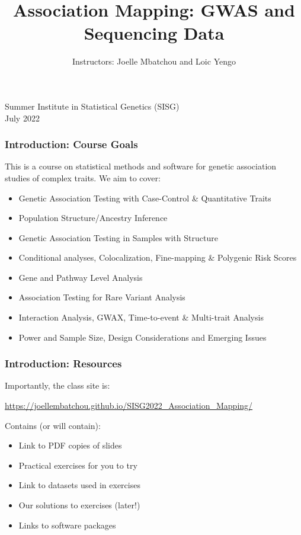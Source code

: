 \documentclass{beamer}
\title [Introduction to Association Mapping Module] {  \fontsize{12}{15}\selectfont Association Mapping: GWAS and Sequencing Data }
\author{Instructors: Joelle Mbatchou and Loic Yengo}
\date{}
\begin{document}
\begin{frame}
\titlepage
\vspace{-2cm}
\begin{center}
{ \large Summer Institute in Statistical Genetics (SISG) \\}
\vspace{.3cm}
 {\large July 2022 \\}
\vspace{.8cm}
\end{center}
\end{frame}



\begin{frame}
\frametitle{\bf Introduction: Course Goals}
This is a course on statistical methods and software for genetic association studies of complex traits. We aim to cover:
{\small
\begin{itemize}
\item Genetic Association Testing with Case-Control  \& Quantitative Traits
\item Population Structure/Ancestry Inference 
\item Genetic Association Testing in Samples with Structure
\item Conditional analyses, Colocalization, Fine-mapping \& Polygenic Risk Scores
\item Gene and Pathway Level Analysis 
\item Association Testing for Rare Variant Analysis
\item Interaction Analysis, GWAX, Time-to-event \& Multi-trait Analysis
\item Power and Sample Size, Design Considerations and Emerging Issues
\end{itemize}
}
\end{frame}


\begin{frame}[fragile]
\frametitle{\bf Introduction: Resources}

Importantly, the class site is: 
{\color{red}
 
\url{https://joellembatchou.github.io/SISG2022_Association_Mapping/}

}
\vspace{.3cm}
Contains (or will contain):
\begin{itemize}
\item Link to PDF copies of slides
\item Practical exercises for you to try
\item Link to datasets used in exercises
\item Our solutions to exercises (later!)
\item Links to software packages
\end{itemize}
\end{frame}
\end{document}
